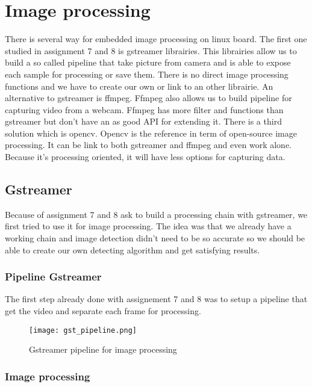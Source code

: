 \section{Image processing}

There is several way for embedded image processing on linux board. The first one studied in assignment 7 and 8 is gstreamer librairies. This librairies allow us to build a so called pipeline that take picture from camera and is able to expose each sample for processing or save them. There is no direct image processing functions and we have to create our own or link to an other librairie. An alternative to gstreamer is ffmpeg. Ffmpeg also allows us to build pipeline for capturing video from a webcam. Ffmpeg has more filter and functions than gstreamer but don't have an as good API for extending it. There is a third solution which is opencv. Opencv is the reference in term of open-source image processing. It can be link to both gstreamer and ffmpeg and even work alone. Because it's processing oriented, it will have less options for capturing data. 

\subsection{Gstreamer }

Because of assignment 7 and 8 ask to build a processing chain with gstreamer, we first tried to use it for image processing. The idea was that we already have a working chain and image detection didn't need to be so accurate so we should be able to create our own detecting algorithm and get satisfying results.

\subsubsection{Pipeline Gstreamer}
The first step already done with assignement 7 and  8 was to setup a pipeline that get the video and separate each frame for processing. 

\begin{figure}[!ht]
\centering
 \texttt{[image: gst\_pipeline.png]}
 \caption{Gstreamer pipeline for image processing}
 \label{gst_pip}
\end{figure}

\subsubsection{Image processing}

